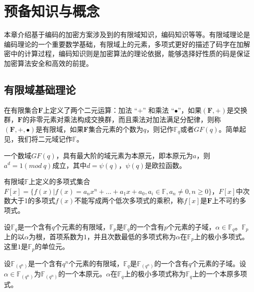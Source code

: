 \chapter{预备知识与概念}
\label{chap1}
本章介绍基于编码的加密方案涉及到的有限域知识，编码知识等等。有限域理论是编码理论的一个重要数学基础，有限域上的元素，多项式更好的描述了码字在加解密中的计算过程，编码知识则是加密算法的理论依据，能够选择好性质的码是保证加密算法安全和高效的前提。

\section{有限域基础理论}
\begin{define}[有限域]
	在有限集合$\mathbf{F}$上定义了两个二元运算：加法 “$+$” 和乘法 “$\bullet$”，如果$(\mathbf{F}, +)$是交换群，$\mathbf{F}$的非零元素对乘法构成交换群，而且乘法对加法满足分配律，则称$(\mathbf{F}, +, \bullet)$是有限域，如果$\mathbf{F}$集合元素的个数为$q$，则记作$\mathbb{F}_q$或者$GF(q)$。简单起见，我们将二元域记作$\mathbb{F}$。
\end{define}

\begin{define}[本原元]
	一个数域$GF(q)$，具有最大阶的域元素为本原元，即本原元为$a$，则$a^d=1(mod~ q)$成立，其中$d=\psi(q)$，$\psi(q)$是欧拉函数。
\end{define}

\begin{define}[不可约多项式]
	有限域$\mathbb{F}$上定义的多项式集合$F[x]=\{f(x)|f(x)=a_nx^n + ... + a_1x + a_0,a_i \in \mathbb{F}, a_n \neq 0, n \geq 0\}$，$F[x]$中次数大于1的多项式$f(x)$不能写成两个低次多项式的乘积，称$f[x]$是$\mathbf{F}$上不可约多项式。
\end{define}

\begin{define}[极小多项式]
	设$\mathbb{F}_q$是一个含有$q$个元素的有限域，$\mathbb{F}_p$是$\mathbb{F}_q$的一个含有$p$个元素的子域，$\alpha \in \mathbb{F}_q$。$\mathbb{F}_p$上的以$\alpha$为根，首项系数为$1$，并且次数最低的多项式称为$\alpha$在$\mathbb{F}_p$上的极小多项式。这里$1$是$\mathbb{F}_p$的单位元。
\end{define}

\begin{define}[本原多项式]
	设$\mathbb{F}_(q^n)$是一个含有$q^n$个元素的有限域，$\mathbb{F}_q$是$\mathbb{F}_(q^n)$的一个含有$q$个元素的子域。设$\alpha \in \mathbb{F}_(q^n)$为$\mathbb{F}_(q^n)$的一个本原元。$\alpha$在$\mathbb{F}_q$上的极小多项式称为$\mathbb{F}_q$上的一个本原多项式。
\end{define}

